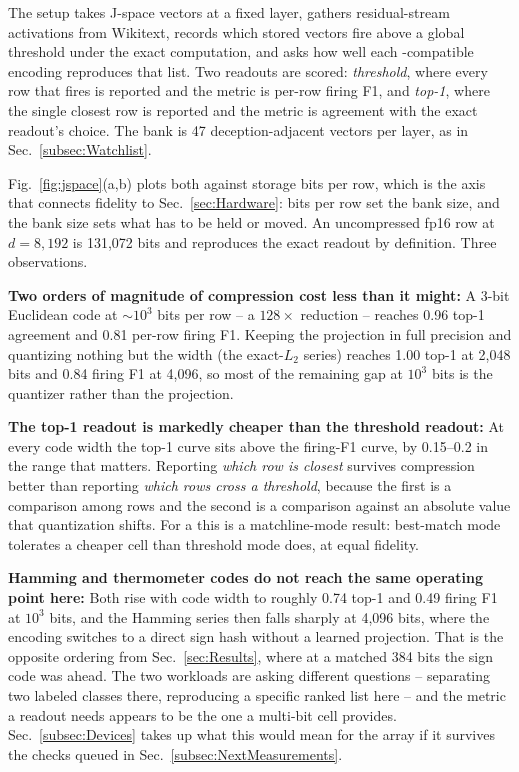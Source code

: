 The setup takes J-space vectors at a fixed layer, gathers residual-stream
activations from Wikitext, records which stored vectors fire above a
global threshold under the exact computation, and asks how well each
\cam-compatible encoding reproduces that list. Two readouts are scored:
\emph{threshold}, where every row that fires is reported and the metric
is per-row firing F1, and \emph{top-1}, where the single closest row is
reported and the metric is agreement with the exact readout's choice.
The bank is 47 deception-adjacent vectors per layer, as in
Sec.~\ref{subsec:Watchlist}.

Fig.~\ref{fig:jspace}(a,b) plots both against storage bits per \cam
row, which is the axis that connects fidelity to
Sec.~\ref{sec:Hardware}: bits per row set the bank size, and the bank
size sets what has to be held or moved. An uncompressed fp16 row at
$d=8{,}192$ is 131{,}072 bits and reproduces the exact readout by
definition. Three observations.

\textbf{Two orders of magnitude of compression cost less than it might:}
A 3-bit Euclidean code at $\sim$$10^{3}$ bits per row -- a $128\times$
reduction -- reaches \hbox{0.96} top-1 agreement and 0.81 per-row firing
F1. Keeping the projection in full precision and quantizing nothing but
the width (the exact-$L_2$ series) reaches 1.00 top-1 at 2{,}048 bits and
0.84 firing F1 at 4{,}096, so most of the remaining gap at $10^{3}$ bits
is the quantizer rather than the projection.

\textbf{The top-1 readout is markedly cheaper than the threshold
readout:} At every code width the top-1 curve sits above the firing-F1
curve, by 0.15--0.2 in the range that matters. Reporting \emph{which row
is closest} survives compression better than reporting \emph{which rows
cross a threshold}, because the first is a comparison among rows and the
second is a comparison against an absolute value that quantization
shifts. For a \cam this is a matchline-mode result: best-match mode
tolerates a cheaper cell than threshold mode does, at equal fidelity.

\textbf{Hamming and thermometer codes do not reach the same operating
point here:} Both rise with code width to roughly 0.74 top-1 and 0.49
firing F1 at $10^{3}$ bits, and the Hamming series then falls sharply at
4{,}096 bits, where the encoding switches to a direct sign hash without a
learned projection. That is the opposite ordering from
Sec.~\ref{sec:Results}, where at a matched 384 bits the sign code was
ahead. The two workloads are asking different questions -- separating two
labeled classes there, reproducing a specific ranked list here -- and the
metric a readout needs appears to be the one a multi-bit cell provides.
Sec.~\ref{subsec:Devices} takes up what this would mean for the array
if it survives the checks queued in
Sec.~\ref{subsec:NextMeasurements}.

